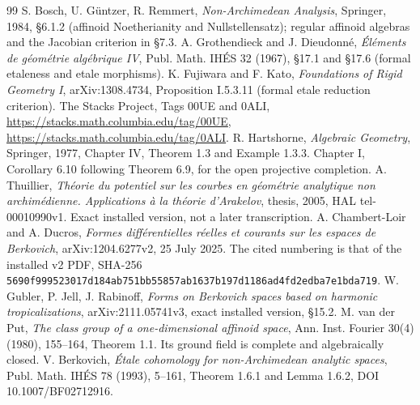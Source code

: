 \documentclass[11pt]{article}
\begin{document}
\begin{thebibliography}{99}
 S. Bosch, U. G\"untzer, R. Remmert,
\emph{Non-Archimedean Analysis}, Springer, 1984, \S6.1.2
(affinoid Noetherianity and Nullstellensatz); regular affinoid
algebras and the Jacobian criterion in \S7.3.
 A. Grothendieck and J. Dieudonn\'e,
\emph{\'El\'ements de g\'eom\'etrie alg\'ebrique IV},
Publ. Math. IH\'ES 32 (1967), \S17.1 and \S17.6
(formal etaleness and etale morphisms).
 K. Fujiwara and F. Kato,
\emph{Foundations of Rigid Geometry I}, arXiv:1308.4734,
Proposition I.5.3.11 (formal etale reduction criterion).
 The Stacks Project, Tags 00UE and 0ALI,
\url{https://stacks.math.columbia.edu/tag/00UE},
\url{https://stacks.math.columbia.edu/tag/0ALI}.
 R. Hartshorne, \emph{Algebraic Geometry},
Springer, 1977, Chapter IV, Theorem 1.3 and Example 1.3.3.
Chapter I, Corollary 6.10 following Theorem 6.9, for the open projective completion.
 A. Thuillier, \emph{Th\'eorie du potentiel sur
les courbes en g\'eom\'etrie analytique non archim\'edienne.
Applications \`a la th\'eorie d'Arakelov}, thesis, 2005,
HAL tel-00010990v1. Exact installed version, not a later
transcription.
 A. Chambert-Loir and A. Ducros,
\emph{Formes diff\'erentielles r\'eelles et courants sur les
espaces de Berkovich}, arXiv:1204.6277v2, 25 July 2025.
The cited numbering is that of the installed v2 PDF, SHA-256
\nolinkurl{5690f999523017d184ab751bb55857ab1637b197d1186ad4fd2edba7e1bda719}.
 W. Gubler, P. Jell, J. Rabinoff,
\emph{Forms on Berkovich spaces based on harmonic tropicalizations},
arXiv:2111.05741v3, exact installed version, \S15.2.
 M. van der Put, \emph{The class group of a
one-dimensional affinoid space}, Ann. Inst. Fourier 30(4) (1980),
155--164, Theorem 1.1. Its ground field is complete and
algebraically closed.
 V. Berkovich, \emph{\'Etale cohomology for
non-Archimedean analytic spaces}, Publ. Math. IH\'ES 78 (1993),
5--161, Theorem 1.6.1 and Lemma 1.6.2,
DOI 10.1007/BF02712916.
\end{thebibliography}
\end{document}
